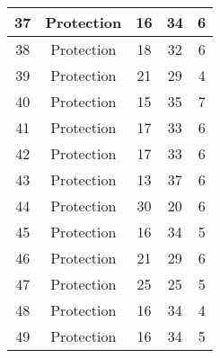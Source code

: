 \documentclass[results.tex]{subfiles}
\begin{document}
\begin{center}
\begin{tabular}{| c || c | c | c | c |}
            \hline
            37                      & Protection                   & 16                     & 34                      & 6                    \\
            \hline
            38                      & Protection                   & 18                     & 32                      & 6                    \\
            \hline
            39                      & Protection                   & 21                     & 29                      & 4                    \\
            \hline
            40                      & Protection                   & 15                     & 35                      & 7                    \\
            \hline
            41                      & Protection                   & 17                     & 33                      & 6                    \\
            \hline
            42                      & Protection                   & 17                     & 33                      & 6                    \\
            \hline
            43                      & Protection                   & 13                     & 37                      & 6                    \\
            \hline
            44                      & Protection                   & 30                     & 20                      & 6                    \\
            \hline
            45                      & Protection                   & 16                     & 34                      & 5                    \\
            \hline
            46                      & Protection                   & 21                     & 29                      & 6                    \\
            \hline
            47                      & Protection                   & 25                     & 25                      & 5                    \\
            \hline
            48                      & Protection                   & 16                     & 34                      & 4                    \\
            \hline
            49                      & Protection                   & 16                     & 34                      & 5                    \\
            \hline
        \end{tabular}
    \end{center}
\end{document}
